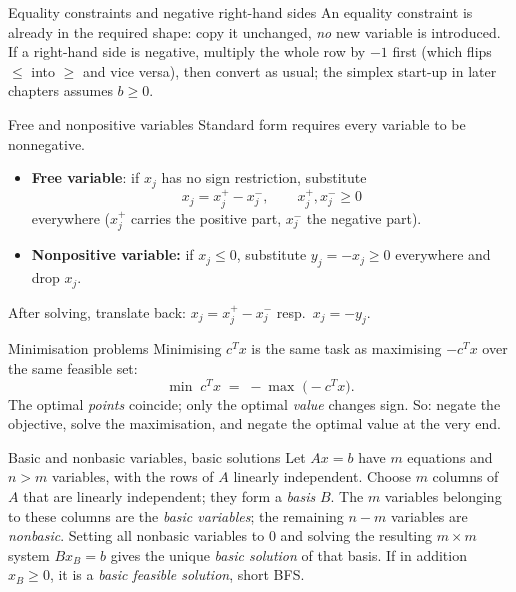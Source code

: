 \begin{rulebox}{Equality constraints and negative right-hand sides}
An equality constraint is already in the required shape: copy it unchanged,
\emph{no} new variable is introduced. If a right-hand side is negative,
multiply the whole row by $-1$ first (which flips $\le$ into $\ge$ and vice
versa), then convert as usual; the simplex start-up in later chapters
assumes $b\ge 0$.
\end{rulebox}

\begin{rulebox}{Free and nonpositive variables}
Standard form requires every variable to be nonnegative.
\begin{itemize}[leftmargin=1.6em,itemsep=0.3ex]
  \item \textbf{Free variable}: if $x_{j}$ has no sign
        restriction, substitute
        \[
          x_{j}=x_{j}^{+}-x_{j}^{-},\qquad x_{j}^{+},x_{j}^{-}\ge 0
        \]
        everywhere ($x_{j}^{+}$ carries the positive part, $x_{j}^{-}$ the
        negative part).
  \item \textbf{Nonpositive variable:} if $x_{j}\le 0$, substitute
        $y_{j}=-x_{j}\ge 0$ everywhere and drop $x_{j}$.
\end{itemize}
After solving, translate back: $x_{j}=x_{j}^{+}-x_{j}^{-}$ resp.\
$x_{j}=-y_{j}$.
\end{rulebox}

\begin{rulebox}{Minimisation problems}
Minimising $c^{T}x$ is the same task as maximising $-c^{T}x$ over the same
feasible set:
\[
  \min\; c^{T}x \;=\; -\max\;\bigl(-c^{T}x\bigr) .
\]
The optimal \emph{points} coincide; only the optimal \emph{value} changes
sign. So: negate the objective, solve the maximisation, and negate the
optimal value at the very end.
\end{rulebox}

\begin{rulebox}{Basic and nonbasic variables, basic solutions}
Let $Ax=b$ have $m$ equations and $n>m$ variables, with the rows of $A$
linearly independent. Choose $m$ columns of $A$ that are linearly
independent; they form a \emph{basis} $B$. The $m$ variables
belonging to these columns are the \emph{basic variables}; the remaining $n-m$ variables are \emph{nonbasic}. Setting all nonbasic variables to $0$ and
solving the resulting $m\times m$ system $Bx_{B}=b$ gives the unique
\emph{basic solution} of that basis. If in addition
$x_{B}\ge 0$, it is a \emph{basic feasible solution}, short BFS.
\end{rulebox}

